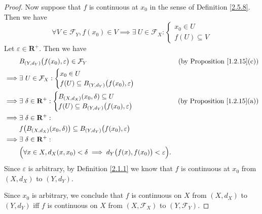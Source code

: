 \begin{proof}
    Now suppose that \(f\) is continuous at \(x_0\) in the sense of Definition \ref{2.5.8}.
    Then we have
    \[
        \forall V \in \mathcal{F}_Y, f(x_0) \in V \implies \exists\ U \in \mathcal{F}_X : \begin{cases}
            x_0 \in U \\
            f(U) \subseteq V
        \end{cases}
    \]
    Let \(\varepsilon \in \mathbf{R}^+\).
    Then we have
    \begin{align*}
                 & B_{(Y, d_Y)}\big(f(x_0), \varepsilon\big) \in \mathcal{F}_Y                                       & \text{(by Proposition \ref{1.2.15}(c))} \\
        \implies & \exists\ U \in \mathcal{F}_X : \begin{cases}
                                                      x_0 \in U \\
                                                      f(U) \subseteq B_{(Y, d_Y)}\big(f(x_0), \varepsilon\big)
                                                  \end{cases}                                                      \\
        \implies & \exists\ \delta \in \mathbf{R}^+ : \begin{cases}
                                                          B_{(X, d_X)}(x_0, \delta) \subseteq U \\
                                                          f(U) \subseteq B_{(Y, d_Y)}\big(f(x_0), \varepsilon\big)
                                                      \end{cases}                                          & \text{(by Proposition \ref{1.2.15}(a))}           \\
        \implies & \exists\ \delta \in \mathbf{R}^+ :                                                                                                          \\
                 & f\big(B_{(X, d_X)}(x_0, \delta)\big) \subseteq B_{(Y, d_Y)}\big(f(x_0), \varepsilon\big)                                                    \\
        \implies & \exists\ \delta \in \mathbf{R}^+ :                                                                                                          \\
                 & \Big(\forall x \in X, d_X(x, x_0) < \delta \implies d_Y\big(f(x), f(x_0)\big) < \varepsilon\Big).
    \end{align*}
    Since \(\varepsilon\) is arbitrary, by Definition \ref{2.1.1} we know that \(f\) is continuous at \(x_0\) from \((X, d_X)\) to \((Y, d_Y)\).

    Since \(x_0\) is arbitrary, we conclude that \(f\) is continuous on \(X\) from \((X, d_X)\) to \((Y, d_Y)\) iff \(f\) is continuous on \(X\) from \((X, \mathcal{F}_X)\) to \((Y, \mathcal{F}_Y)\).
\end{proof}

